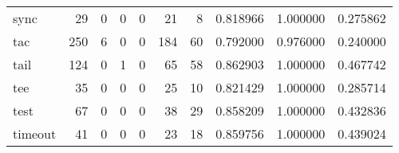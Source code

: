 \begin{tabular}{lrrrrrrrrr}
sync      &                                        29 &                                                  0 &                                                  0 &                                                  0 &                                                 21 &                                                  8 &                                           0.818966 &                               1.000000 &                             0.275862 \\
tac       &                                       250 &                                                  6 &                                                  0 &                                                  0 &                                                184 &                                                 60 &                                           0.792000 &                               0.976000 &                             0.240000 \\
tail      &                                       124 &                                                  0 &                                                  1 &                                                  0 &                                                 65 &                                                 58 &                                           0.862903 &                               1.000000 &                             0.467742 \\
tee       &                                        35 &                                                  0 &                                                  0 &                                                  0 &                                                 25 &                                                 10 &                                           0.821429 &                               1.000000 &                             0.285714 \\
test      &                                        67 &                                                  0 &                                                  0 &                                                  0 &                                                 38 &                                                 29 &                                           0.858209 &                               1.000000 &                             0.432836 \\
timeout   &                                        41 &                                                  0 &                                                  0 &                                                  0 &                                                 23 &                                                 18 &                                           0.859756 &                               1.000000 &                             0.439024 \\

\end{tabular}
